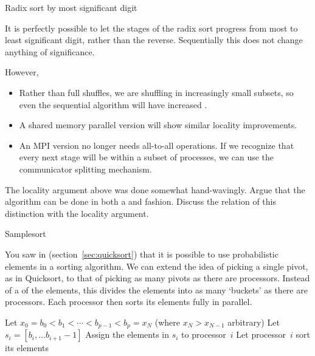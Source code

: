  {Radix sort by most significant digit}

It is perfectly possible to let the stages of the radix sort progress
from most to least significant digit, rather than the
reverse. Sequentially this does not change anything of significance.

However,
\begin{itemize}
\item Rather than full shuffles, we are shuffling in increasingly
  small subsets, so even the sequential algorithm will have increased
  .
\item A shared memory parallel version will show similar locality
  improvements.
\item An MPI version no longer needs all-to-all operations. If we
  recognize that every next stage will be within a subset of
  processes, we can use the communicator splitting mechanism.
\end{itemize}

\begin{exercise}
  The locality argument above was done somewhat hand-wavingly. Argue
  that the algorithm can be done in both a 
  and  fashion. Discuss the relation of this
  distinction with the locality argument.
\end{exercise}



 {Samplesort}
\label{sec:samplesort}

You saw in  (section~\ref{sec:quicksort}) that
it is possible to use probabilistic elements in a sorting
algorithm. We can extend the idea of picking a single pivot, as in
Quicksort, to that of picking as many pivots as there are processors.
Instead of a  of the elements, this divides the
elements into as many `buckets' as there are processors. Each
processor then sorts its elements fully in parallel.

\begin{displayalgorithm}
  Let $x_0=b_0<b_1<\cdots<b_{p-1}<b_p=x_N$ (where $x_N>x_{N-1}$ arbitrary)\;
   { Let $s_i=[b_i,\ldots b_{i+1}-1]$ }
   { Assign the elements in $s_i$ to
    processor~$i$ }
   { Let processor~$i$ sort its
    elements }
  \caption{The Samplesort algorithm.}
\end{displayalgorithm}


